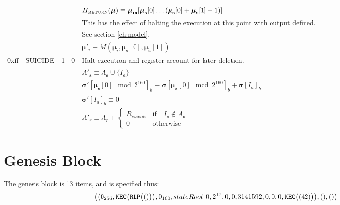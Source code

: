 \documentclass[9pt,oneside]{amsart}
\begin{document}
\begin{tabular*}{\columnwidth}[h]{rlrrl}
&&&& $H_{\text{\tiny RETURN}}(\boldsymbol{\mu}) \equiv \boldsymbol{\mu}_\mathbf{m}[ \boldsymbol{\mu}_\mathbf{s}[0] \dots ( \boldsymbol{\mu}_\mathbf{s}[0] + \boldsymbol{\mu}_\mathbf{s}[1] - 1 ) ]$ \\
&&&& This has the effect of halting the execution at this point with output defined.\\
&&&& See section \ref{ch:model}. \\
&&&& $\boldsymbol{\mu}'_i \equiv M(\boldsymbol{\mu}_i, \boldsymbol{\mu}_\mathbf{s}[0], \boldsymbol{\mu}_\mathbf{s}[1])$ \\
\midrule
0xff & {\small SUICIDE} & 1 & 0 & Halt execution and register account for later deletion. \\
&&&& $A'_\mathbf{s} \equiv A_\mathbf{s} \cup \{ I_a \}$ \\
&&&& $\boldsymbol{\sigma}'[\boldsymbol{\mu}_\mathbf{s}[0] \mod 2^{160}]_b \equiv \boldsymbol{\sigma}[\boldsymbol{\mu}_\mathbf{s}[0] \mod 2^{160}]_b + \boldsymbol{\sigma}[I_a]_b$ \\
&&&& $\boldsymbol{\sigma}'[I_a]_b \equiv 0$ \\
&&&& $A'_{r} \equiv A_{r} + \begin{cases}
R_{suicide} & \text{if} \quad I_a \notin A_\mathbf{s} \\
0 & \text{otherwise}
\end{cases}$ \\\bottomrule
\end{tabular*}


\section{Genesis Block}\label{app:genesis}

The genesis block is 13 items, and is specified thus:
\begin{equation}
\big( \big( 0_{256}, \mathtt{\tiny KEC}\big(\mathtt{\tiny RLP}\big( () \big)\big), 0_{160}, stateRoot, 0, 2^{17}, 0, 0, 3141592, 0, 0, 0, \mathtt{\tiny KEC}\big( (42) \big) \big), (), () \big)
\end{equation}
\end{document}
